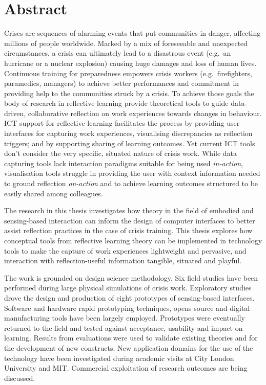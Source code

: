 \chapter{Abstract}

Crises are sequences of alarming events that put communities in danger,
affecting millions of people worldwide. Marked by a mix of foreseeable
and unexpected circumstances, a crisis can ultimately lead to a
disastrous event (e.g.~an hurricane or a nuclear explosion) causing huge
damages and loss of human lives. Continuous training for preparedness
empowers crisis workers (e.g.~firefighters, paramedics, managers) to
achieve better performances and commitment in providing help to the
communities struck by a crisis. To achieve those goals the body of
research in reflective learning provide theoretical tools to guide
data-driven, collaborative reflection on work experiences towards
changes in behaviour. ICT support for reflective learning facilitates
the process by providing user interfaces for capturing work experiences,
visualising discrepancies as reflection triggers; and by supporting
sharing of learning outcomes. Yet current ICT tools don't consider the
very specific, situated nature of crisis work. While data capturing
tools lack interaction paradigms suitable for being used
\emph{in-action}, visualisation tools struggle in providing the user
with context information needed to ground reflection \emph{on-action}
and to achieve learning outcomes structured to be easily shared among
colleagues.

The research in this thesis investigates how theory in the field of
embodied and sensing-based interaction can inform the design of computer
interfaces to better assist reflection practices in the case of crisis
training. This thesis explores how conceptual tools from reflective
learning theory can be implemented in technology tools to make the
capture of work experiences lightweight and pervasive, and interaction
with reflection-useful information tangible, situated and playful.

The work is grounded on design science methodology. Six field studies
have been performed during large physical simulations of crisis work.
Exploratory studies drove the design and production of eight prototypes
of sensing-based interfaces. Software and hardware rapid prototyping
techniques, opens source and digital manufacturing tools have been
largely employed. Prototypes were eventually returned to the field and
tested against acceptance, usability and impact on learning. Results
from evaluations were used to validate existing theories and for the
development of new constructs. New application domains for the use of
the technology have been investigated during academic visits at City
London University and MIT. Commercial exploitation of research outcomes
are being discussed.

